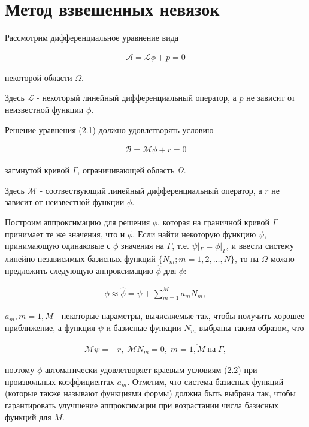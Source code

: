\documentclass[14pt]{extreport}
\begin{document}
\section{Метод взвешенных невязок}

Рассмотрим дифференциальное уравнение вида

\begin{eqnarray}
 \mathcal A= \mathcal L\phi + p=0
\end{eqnarray}

 некоторой области $\Omega$.

Здесь $\mathcal L$ - некоторый линейный дифференциальный оператор, а $p$ не зависит от неизвестной функции $\phi$.

Решение уравнения (2.1) должно удовлетворять условию

\begin{eqnarray}
\mathcal B = \mathcal M \phi+r=0
\end{eqnarray}

 загмнутой кривой $\Gamma$, ограничивающей область $\Omega$.

Здесь $\mathcal M$ - соотвествующий линейный дифференциальный оператор, а $r$ не зависит от неизвестной функции $\phi$.

Построим аппроксимацию для решения $\phi$, которая на граничной кривой $\Gamma$ принимает те же значения, что и $\phi$. Если найти некоторую функцию $\psi$, принимающую одинаковые с $\phi$ значения на $\Gamma$, т.е. $\psi|_\Gamma= \phi|_\Gamma$, и ввести систему линейно независимых базисных функций $\{N_m; m = 1,2, \dots, N\}$, то на $\Omega$ можно предложить следующую аппроксимацию $\hat{\phi}$ для $\phi$: 

\begin{eqnarray}
\phi \approx \hat\phi = \psi + \sum\limits_{m=1}^{M} a_mN_m,
\end{eqnarray}

 $a_m, m= \overline{1,M}$ - некоторые параметры, вычисляемые так, чтобы получить хорошее приближение, а функция $\psi$ и базисные функции $N_m$ выбраны таким образом, что

\begin{eqnarray}
 \mathcal M\psi=-r, \; \mathcal M N_m=0, \; m=\overline{1,M} \; \text{на} \; \Gamma,
\end{eqnarray}

 поэтому $\phi$ автоматически удовлетворяет краевым условиям (2.2) при произвольных коэффициентах $a_m$. Отметим, что система базисных функций (которые также называют функциями формы) должна быть выбрана так, чтобы гарантировать улучшение аппроксимации при возрастании числа базисных функций для $M$.
\end{document}
